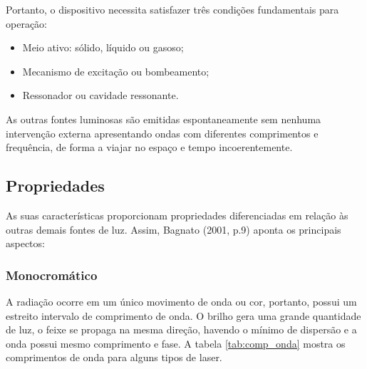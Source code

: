 Portanto, o dispositivo necessita satisfazer três condições fundamentais para operação:

\begin{itemize}
	\item Meio ativo: sólido, líquido ou gasoso;
	\item Mecanismo de excitação ou bombeamento;
	\item Ressonador ou cavidade ressonante.
\end{itemize}

As outras fontes luminosas são emitidas espontaneamente sem nenhuma intervenção externa apresentando ondas com diferentes comprimentos e frequência, de forma a viajar no espaço e tempo incoerentemente.

\subsection{Propriedades}

As suas características proporcionam propriedades diferenciadas em relação às outras demais fontes de luz. Assim, Bagnato (2001, p.9) aponta os principais aspectos:

\subsubsection{Monocromático}

A radiação ocorre em um único movimento de onda ou cor, portanto, possui um estreito intervalo de comprimento de onda. O brilho gera uma grande quantidade de luz, o feixe se propaga na mesma direção, havendo o mínimo de dispersão e a onda possui mesmo comprimento e fase. A tabela \ref{tab:comp_onda} mostra os comprimentos de onda para alguns tipos de laser.


